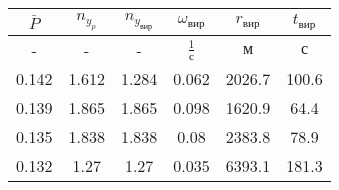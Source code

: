 \begin{tabular}{|c|c|c|c|c|c|}
\hline
$\bar{P}$ & $n_{y_{p}}$ & $n_{y_{вир}}$ & $\omega_{вир}$ & $r_{вир}$ & $t_{вир}$ \\ 
\hline
- & - & - & $\frac{1}{с}$ & $м$ & $с$ \\ 
\hline
0.142 & 1.612 & 1.284 & 0.062 & 2026.7 & 100.6 \\ 
\hline
0.139 & 1.865 & 1.865 & 0.098 & 1620.9 & 64.4 \\ 
\hline
0.135 & 1.838 & 1.838 & 0.08 & 2383.8 & 78.9 \\ 
\hline
0.132 & 1.27 & 1.27 & 0.035 & 6393.1 & 181.3 \\ 
\hline
\end{tabular}